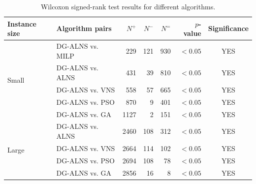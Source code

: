 \begin{table}[tb]
    \centering
    \caption{Wilcoxon signed-rank test results for different algorithms.}
    \label{tab:wilcoxon_results}
    \footnotesize
    \renewcommand{\arraystretch}{1.08}
    \setlength{\tabcolsep}{6pt}
    \begin{tabular}{llrrrrc}
        \toprule
        Instance size & Algorithm pairs & $N^{+}$ & $N^{-}$ & $N^{=}$ & $p$-value & Significance \\
        \midrule
        \multirow{5}{*}{Small} & DG-ALNS vs. MILP & 229 & 121 & 930 & $<0.05$ & YES \\
         & DG-ALNS vs. ALNS & 431 & 39 & 810 & $<0.05$ & YES \\
         & DG-ALNS vs. VNS & 558 & 57 & 665 & $<0.05$ & YES \\
         & DG-ALNS vs. PSO & 870 & 9 & 401 & $<0.05$ & YES \\
         & DG-ALNS vs. GA & 1127 & 2 & 151 & $<0.05$ & YES \\
        \midrule
        \multirow{4}{*}{Large} & DG-ALNS vs. ALNS & 2460 & 108 & 312 & $<0.05$ & YES \\
         & DG-ALNS vs. VNS & 2664 & 114 & 102 & $<0.05$ & YES \\
         & DG-ALNS vs. PSO & 2694 & 108 & 78 & $<0.05$ & YES \\
         & DG-ALNS vs. GA & 2856 & 16 & 8 & $<0.05$ & YES \\
        \bottomrule
    \end{tabular}
\end{table}
